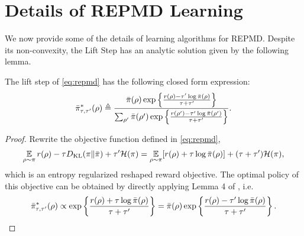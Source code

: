 \section{Details of REPMD Learning}
\label{subsec:learning}
\label{appx:learning}

We now provide some of the details of learning algorithms for REPMD.
Despite its non-convexity, the Lift Step
has an analytic solution given by the following lemma. 

\begin{lem}
	\label{lem:opt_pi_ref}
	The lift step of \cref{eq:repmd} has the following closed form expression:
	\begin{equation}
	\label{eq:pitautauprime}
	\bar{\pi}_{\tau,\tau^{\prime}}^*(\rho) \triangleq \frac{\bar{\pi}(\rho) \exp\left\{ \frac{r(\rho)-\tau^{\prime} \log \bar{\pi}(\rho) }{ \tau+\tau^{\prime}} \right\}}{ \sum_{\rho^{\prime}}{\bar{\pi}(\rho^{\prime}) \exp\left\{ \frac{r(\rho^{\prime})-\tau^{\prime} \log \bar{\pi}(\rho^{\prime})}{ \tau+\tau^{\prime}} \right\} } }.
	\end{equation}
\end{lem}
\begin{proof}
	Rewrite the objective function defined in \cref{eq:repmd},
	\begin{equation}
	\operatorname*{\mathbb{E}}\limits_{\rho \sim \pi} r(\rho)  - \tau D_{\mathrm{KL}}(\pi \| \bar{\pi}) + \tau^{\prime} \mathcal{H}(\pi) = \operatorname*{\mathbb{E}}\limits_{\rho \sim \pi} [r(\rho) + \tau \log \bar{\pi}(\rho)] + (\tau+\tau^{\prime}) \mathcal{H}(\pi),
	\end{equation}
	which is an entropy regularized reshaped reward objective. The optimal policy of this objective can be obtained by directly applying Lemma 4 of \citet{nachum2017bridging}, i.e.
	\begin{equation}
	\label{pi_bar_star_tau_tauprime_prop_form}
	\bar{\pi}_{\tau,\tau^{\prime}}^*(\rho)\propto \exp\left\{ \frac{r(\rho)+\tau \log \bar{\pi}(\rho)}{\tau+\tau^{\prime}} \right\} = \bar{\pi}(\rho) \exp\left\{ \frac{r(\rho)-\tau^{\prime} \log \bar{\pi}(\rho)}{\tau+\tau^{\prime}} \right\}. \qedhere
	\end{equation}
\end{proof}

